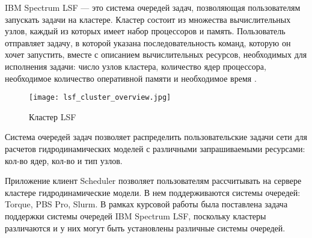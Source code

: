 

IBM Spectrum LSF --- это система очередей задач, позволяющая пользователям запускать задачи на кластере. Кластер состоит из множества вычислительных узлов, каждый из которых имеет набор процессоров и память. Пользователь отправляет задачу, в которой указана последовательность команд, которую он хочет запустить, вместе с описанием вычислительных ресурсов, необходимых для исполнения задачи: число узлов кластера, количество ядер процессора, необходимое количество оперативной памяти и необходимое время \cite{hpc-llnl}.

\begin{figure}[h]
    \centering
    \texttt{[image: lsf\_cluster\_overview.jpg]}
    \caption{Кластер LSF}
    \label{fig:LSF_cluster}
\end{figure}

Система очередей задач позволяет распределить пользовательские задачи сети для расчетов гидродинамических моделей с различными запрашиваемыми ресурсами: кол-во ядер, кол-во и тип узлов.

Приложение клиент Scheduler позволяет пользователям рассчитывать на сервере кластере гидродинамические модели. В нем поддерживаются системы очередей: Torque, PBS Pro, Slurm. В рамках курсовой работы была поставлена задача поддержки системы очередей IBM Spectrum LSF, поскольку кластеры различаются и у них могут быть установлены различные системы очередей.

\clearpage

